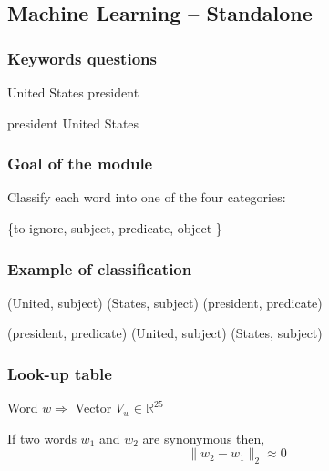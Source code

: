 \subsection{Machine Learning \--- Standalone}

\begin{frame}[fragile]
  \frametitle{Keywords questions}

	
	\begin{center}
  	\alert{United States president}
	\end{center}

	\begin{center}
  	\alert{president United States}
	\end{center}

\end{frame}

\begin{frame}[fragile]
\frametitle{Goal of the module}

Classify each word into one of the four categories: \newline
\begin{center}
 \{to ignore, subject, predicate, object \}
\end{center}

\end{frame}

\begin{frame}[fragile]
	\frametitle{Example of classification}

	\begin{center}
  	\alert{(United, subject) (States, subject) (president, predicate)}
	\end{center}

	\begin{center}
  	\alert{(president, predicate) (United, subject) (States, subject)}
	\end{center}



\end{frame}

\begin{frame}[fragile]
  \frametitle{Look-up table}

	\begin{center}
	Word $w \Rightarrow $ Vector $ V_w \in \mathbb{R}^{25}$
	\end{center}

	\begin{center}
	If two words $w_1$ and $w_2$ are synonymous then, \newline
	$$ \| w_2 - w_1 \|_2 \approx 0 $$
	
	\end{center}



\end{frame}



